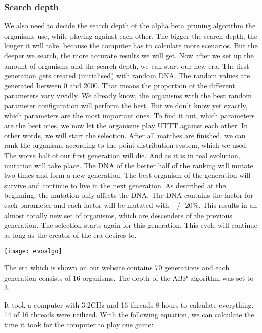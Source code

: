 \subsubsection{Search depth}
We also need to decide the search depth of the alpha beta pruning algorithm the organisms use, while playing against each other. The bigger the search depth, the longer it will take, because the computer has to calculate more scenarios. But the deeper we search, the more accurate results we will get. 
Now after we set up the amount of organisms and the search depth, we can start our new era. The first generation gets created (initialised) with random DNA. The random values are generated between 0 and 2000.
That means the proportion of the different parameters vary vividly. We already know, the organisms with the best random parameter configuration will perform the best. But we don't know yet exactly, which parameters are the most important ones. To find it out, which parameters are the best ones, we now let the organisms play \ac{UTTT} against each other. In other words, we will start the selection. After all matches are finished, we can rank the organisms according to the point distribution system, which we used. The worse half of our first generation will die. And as it is in real evolution, mutation will take place.
The DNA of the better half of the ranking will mutate two times and form a new generation. The best organism of the generation will survive and continue to live in the next generation.
As described at the beginning, the mutation only affects the DNA. The DNA contains the factor for each parameter and each factor will be mutated with +/- 20\%. This results in an almost totally new set of organisms, which are descenders of the previous generation. The selection starts again for this generation.
This cycle will continue as long as the creator of the era desires to. \\

\begin{fixedpic}
	\centering
	\texttt{[image: evoalgo]}
\end{fixedpic}


The era which is shown on our \href{https://slaputtt.firebaseapp.com/advanced.html}{website} contains 70 generations and each generation consists of 16 organisms. The depth of the \ac{ABP} algorithm was set to 3.

It took a computer with 3.2GHz and 16 \acp{thread} 8 hours to calculate everything. 14 of 16 threads were utilized. With the following equation, we can calculate the time it took for the computer to play one game:

